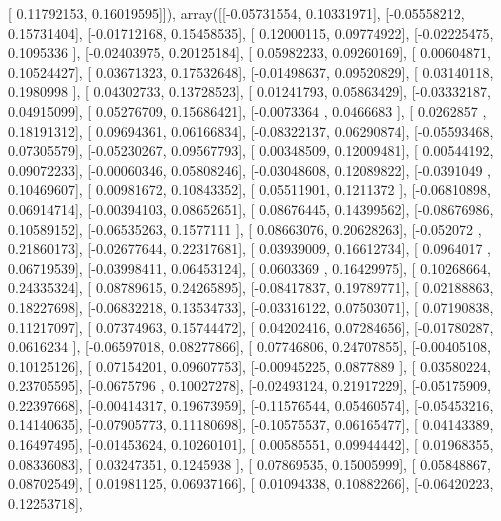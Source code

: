 \documentclass{article}
\begin{document}
       [ 0.11792153,  0.16019595]]), array([[-0.05731554,  0.10331971],
       [-0.05558212,  0.15731404],
       [-0.01712168,  0.15458535],
       [ 0.12000115,  0.09774922],
       [-0.02225475,  0.1095336 ],
       [-0.02403975,  0.20125184],
       [ 0.05982233,  0.09260169],
       [ 0.00604871,  0.10524427],
       [ 0.03671323,  0.17532648],
       [-0.01498637,  0.09520829],
       [ 0.03140118,  0.1980998 ],
       [ 0.04302733,  0.13728523],
       [ 0.01241793,  0.05863429],
       [-0.03332187,  0.04915099],
       [ 0.05276709,  0.15686421],
       [-0.0073364 ,  0.0466683 ],
       [ 0.0262857 ,  0.18191312],
       [ 0.09694361,  0.06166834],
       [-0.08322137,  0.06290874],
       [-0.05593468,  0.07305579],
       [-0.05230267,  0.09567793],
       [ 0.00348509,  0.12009481],
       [ 0.00544192,  0.09072233],
       [-0.00060346,  0.05808246],
       [-0.03048608,  0.12089822],
       [-0.0391049 ,  0.10469607],
       [ 0.00981672,  0.10843352],
       [ 0.05511901,  0.1211372 ],
       [-0.06810898,  0.06914714],
       [-0.00394103,  0.08652651],
       [ 0.08676445,  0.14399562],
       [-0.08676986,  0.10589152],
       [-0.06535263,  0.1577111 ],
       [ 0.08663076,  0.20628263],
       [-0.052072  ,  0.21860173],
       [-0.02677644,  0.22317681],
       [ 0.03939009,  0.16612734],
       [ 0.0964017 ,  0.06719539],
       [-0.03998411,  0.06453124],
       [ 0.0603369 ,  0.16429975],
       [ 0.10268664,  0.24335324],
       [ 0.08789615,  0.24265895],
       [-0.08417837,  0.19789771],
       [ 0.02188863,  0.18227698],
       [-0.06832218,  0.13534733],
       [-0.03316122,  0.07503071],
       [ 0.07190838,  0.11217097],
       [ 0.07374963,  0.15744472],
       [ 0.04202416,  0.07284656],
       [-0.01780287,  0.0616234 ],
       [-0.06597018,  0.08277866],
       [ 0.07746806,  0.24707855],
       [-0.00405108,  0.10125126],
       [ 0.07154201,  0.09607753],
       [-0.00945225,  0.0877889 ],
       [ 0.03580224,  0.23705595],
       [-0.0675796 ,  0.10027278],
       [-0.02493124,  0.21917229],
       [-0.05175909,  0.22397668],
       [-0.00414317,  0.19673959],
       [-0.11576544,  0.05460574],
       [-0.05453216,  0.14140635],
       [-0.07905773,  0.11180698],
       [-0.10575537,  0.06165477],
       [ 0.04143389,  0.16497495],
       [-0.01453624,  0.10260101],
       [ 0.00585551,  0.09944442],
       [ 0.01968355,  0.08336083],
       [ 0.03247351,  0.1245938 ],
       [ 0.07869535,  0.15005999],
       [ 0.05848867,  0.08702549],
       [ 0.01981125,  0.06937166],
       [ 0.01094338,  0.10882266],
       [-0.06420223,  0.12253718],
\end{document}
